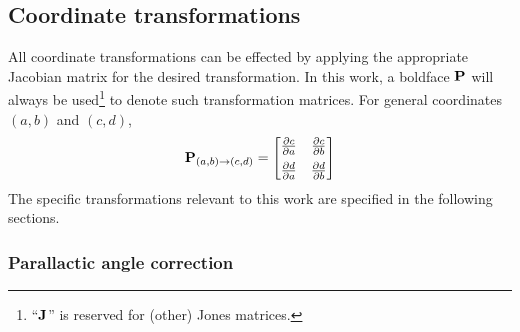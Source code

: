 \documentclass{book}
\newcommand{\pd}[2]{\ensuremath{\frac{\partial #1}{\partial #2}}}
\newcommand{\transmat}[4]{\ensuremath{{\bf P}_{(#1,#2)\rightarrow(#3,#4)}}}
\begin{document}
\subsection{Coordinate transformations}

All coordinate transformations can be effected by applying the appropriate Jacobian matrix for the desired transformation.
In this work, a boldface ${\bf P}$ will always be used\footnote{``${\bf J}$'' is reserved for (other) Jones matrices.} to denote such transformation matrices.
For general coordinates $(a,b)$ and $(c,d)$,
\begin{equation}
    \transmat{a}{b}{c}{d} =
    \begin{bmatrix}
        \pd{c}{a} & \pd{c}{b} \\[5 pt]
        \pd{d}{a} & \pd{d}{b}
    \end{bmatrix}
\end{equation}
The specific transformations relevant to this work are specified in the following sections.

\subsubsection{Parallactic angle correction}
\end{document}
